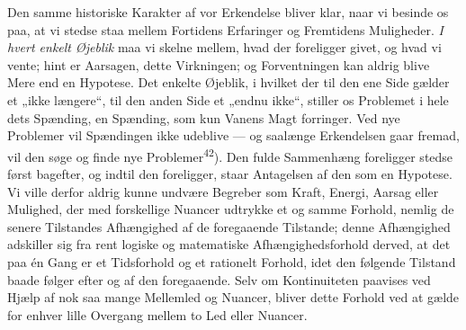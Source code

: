\documentclass[12pt,a4paper,openany]{book}
\begin{document}
Den samme historiske Karakter af vor Erkendelse bliver klar, naar vi besinde os
paa, at vi stedse staa mellem Fortidens Erfaringer og Fremtidens Muligheder.
\textit{I hvert enkelt Øjeblik} maa vi skelne mellem, hvad der foreligger
givet, og hvad vi vente; hint er Aarsagen, dette Virkningen; og Forventningen
kan aldrig blive Mere end en Hypotese. Det enkelte Øjeblik, i hvilket der til
den ene Side gælder et „ikke længere“, til den anden Side et „endnu ikke“,
stiller os Problemet i hele dets Spænding, en Spænding, som kun Vanens Magt
forringer. Ved nye Problemer vil Spændingen ikke udeblive --- og saalænge
Erkendelsen gaar fremad, vil den søge og finde nye
Problemer\textsuperscript{42}). Den fulde Sammenhæng foreligger stedse først
bagefter, og indtil den foreligger, staar Antagelsen af den som en Hypotese. Vi
ville derfor aldrig kunne undvære Begreber som Kraft, Energi, Aarsag eller
Mulighed, der med forskellige Nuancer udtrykke et og samme Forhold, nemlig de
senere Tilstandes Afhængighed af de foregaaende Tilstande; denne Afhængighed
adskiller sig fra rent logiske og matematiske Afhængighedsforhold derved, at
det paa én Gang er et Tidsforhold og et rationelt Forhold, idet den følgende
Tilstand baade følger efter og af den foregaaende. Selv om Kontinuiteten
paavises ved Hjælp af nok saa mange Mellemled og Nuancer, bliver dette Forhold
ved at gælde for enhver lille Overgang mellem to Led eller Nuancer.
\end{document}
